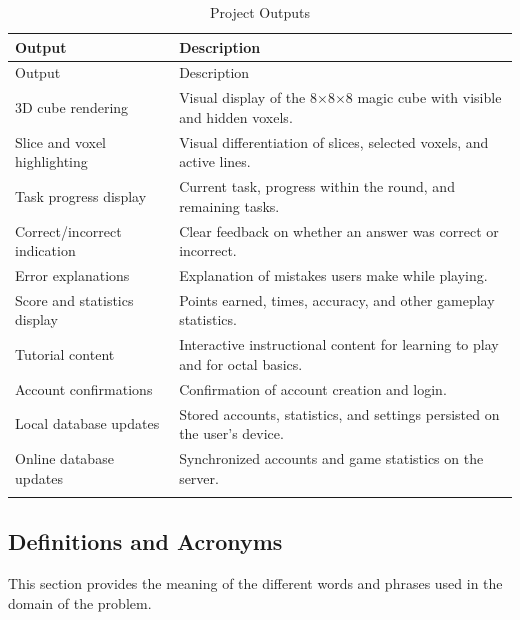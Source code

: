 \documentclass[12pt]{article}
\begin{document}
\begin{longtable}{p{} p{}}
\toprule
Output & Description\\
\midrule
\endfirsthead
\toprule
Output & Description\\
\midrule
\endhead
\endlastfoot
3D cube rendering & Visual display of the 8$\times$8$\times$8 magic cube with visible and hidden voxels. \\
Slice and voxel highlighting & Visual differentiation of slices, selected voxels, and active lines. \\
Task progress display & Current task, progress within the round, and remaining tasks. \\
Correct/incorrect indication & Clear feedback on whether an answer was correct or incorrect. \\
Error explanations & Explanation of mistakes users make while playing. \\
Score and statistics display & Points earned, times, accuracy, and other gameplay statistics. \\
Tutorial content & Interactive instructional content for learning to play and for octal basics. \\
Account confirmations & Confirmation of account creation and login. \\
Local database updates & Stored accounts, statistics, and settings persisted on the user's device. \\
Online database updates & Synchronized accounts and game statistics on the server. \\
\bottomrule
\caption{Project Outputs} \label{tab:ProjectOutputs}
\end{longtable}

\subsection{Definitions and Acronyms}

This section provides the meaning of the different words and phrases used
in the domain of the problem.
\end{document}
